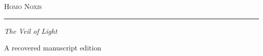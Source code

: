 \documentclass[11pt,twoside,openright]{book}
\begin{document}
\begin{titlepage}
\thispagestyle{empty}
\centering
\vspace*{1.25in}
{\Huge\scshape Homo Noxis\par}
\vspace{0.35in}
{\color{rulegold}\rule{0.55\textwidth}{0.4pt}\par}
\vspace{0.35in}
{\Large\itshape The Veil of Light\par}
\vfill
{\small A recovered manuscript edition\par}
\vspace*{0.65in}
\end{titlepage}
\frontmatter
\mainmatter
\end{document}
